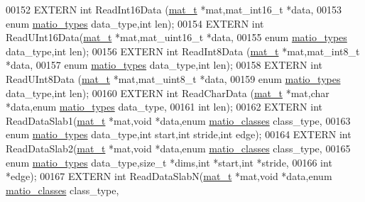 \begin{DoxyCode}
00152 EXTERN \textcolor{keywordtype}{int} ReadInt16Data (\hyperlink{struct__mat__t}{mat\_t} *mat,mat\_int16\_t *data,
00153                \textcolor{keyword}{enum} \hyperlink{group___m_a_t_gacf7b3b879282b7ab3a51190e49bf3453}{matio\_types} data\_type,\textcolor{keywordtype}{int} len);
00154 EXTERN \textcolor{keywordtype}{int} ReadUInt16Data(\hyperlink{struct__mat__t}{mat\_t} *mat,mat\_uint16\_t *data,
00155                \textcolor{keyword}{enum} \hyperlink{group___m_a_t_gacf7b3b879282b7ab3a51190e49bf3453}{matio\_types} data\_type,\textcolor{keywordtype}{int} len);
00156 EXTERN \textcolor{keywordtype}{int} ReadInt8Data  (\hyperlink{struct__mat__t}{mat\_t} *mat,mat\_int8\_t  *data,
00157                \textcolor{keyword}{enum} \hyperlink{group___m_a_t_gacf7b3b879282b7ab3a51190e49bf3453}{matio\_types} data\_type,\textcolor{keywordtype}{int} len);
00158 EXTERN \textcolor{keywordtype}{int} ReadUInt8Data (\hyperlink{struct__mat__t}{mat\_t} *mat,mat\_uint8\_t  *data,
00159                \textcolor{keyword}{enum} \hyperlink{group___m_a_t_gacf7b3b879282b7ab3a51190e49bf3453}{matio\_types} data\_type,\textcolor{keywordtype}{int} len);
00160 EXTERN \textcolor{keywordtype}{int} ReadCharData  (\hyperlink{struct__mat__t}{mat\_t} *mat,\textcolor{keywordtype}{char}  *data,\textcolor{keyword}{enum} \hyperlink{group___m_a_t_gacf7b3b879282b7ab3a51190e49bf3453}{matio\_types} data\_type,
00161                \textcolor{keywordtype}{int} len);
00162 EXTERN \textcolor{keywordtype}{int} ReadDataSlab1(\hyperlink{struct__mat__t}{mat\_t} *mat,\textcolor{keywordtype}{void} *data,\textcolor{keyword}{enum} \hyperlink{group___m_a_t_gad4d60ae7b709fc81bfd744fb4c857c40}{matio\_classes} class\_type,
00163                \textcolor{keyword}{enum} \hyperlink{group___m_a_t_gacf7b3b879282b7ab3a51190e49bf3453}{matio\_types} data\_type,\textcolor{keywordtype}{int} start,\textcolor{keywordtype}{int} stride,\textcolor{keywordtype}{int} edge);
00164 EXTERN \textcolor{keywordtype}{int} ReadDataSlab2(\hyperlink{struct__mat__t}{mat\_t} *mat,\textcolor{keywordtype}{void} *data,\textcolor{keyword}{enum} \hyperlink{group___m_a_t_gad4d60ae7b709fc81bfd744fb4c857c40}{matio\_classes} class\_type,
00165                \textcolor{keyword}{enum} \hyperlink{group___m_a_t_gacf7b3b879282b7ab3a51190e49bf3453}{matio\_types} data\_type,\textcolor{keywordtype}{size\_t} *dims,\textcolor{keywordtype}{int} *start,\textcolor{keywordtype}{int} *stride,
00166                \textcolor{keywordtype}{int} *edge);
00167 EXTERN \textcolor{keywordtype}{int} ReadDataSlabN(\hyperlink{struct__mat__t}{mat\_t} *mat,\textcolor{keywordtype}{void} *data,\textcolor{keyword}{enum} \hyperlink{group___m_a_t_gad4d60ae7b709fc81bfd744fb4c857c40}{matio\_classes} class\_type,

\end{DoxyCode}
